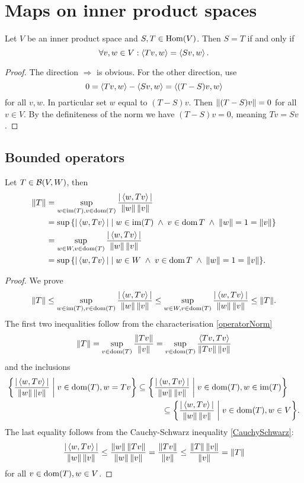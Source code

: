 \section{Maps on inner product spaces}

\begin{lemma} \label{equalityOfMapsInnerProductSpaces}
Let $V$ be an inner product space and $S,T\in\operatorname{Hom}(V)$. Then $S=T$ \textup{if and only if}
\[ \forall v,w\in V: \left\langle Tv,w \right\rangle = \left\langle Sv,w \right\rangle. \]
\end{lemma}
\begin{proof}
The direction $\boxed{\Rightarrow}$ is obvious. For the other direction, use
\[ 0 = \left\langle Tv,w \right\rangle - \left\langle Sv,w \right\rangle = \left\langle (T-S)v,w \right\rangle \]
for all $v,w$. In particular set $w$ equal to $(T-S)v$. Then $\lVert(T-S)v\rVert = 0$ for all $v\in V$. By the definiteness of the norm we have $(T-S)v = 0$, meaning $Tv = Sv$.
\end{proof}

\subsection{Bounded operators}
\begin{lemma} \label{operatorNormInnerProduct}
Let $T\in\operatorname{\mathcal{B}}(V,W)$, then
\begin{align*}
\norm{T} &= \sup_{w\in \im(T),v \in \dom(T)} \frac{|\inner{w,Tv}|}{\norm{w}\,\norm{v}} \\
&= \sup\setbuilder{|\inner{w,Tv}|}{w\in \im(T)\;\land\; v\in\dom{T}\;\land\; \norm{w} = 1 = \norm{v}} \\
&= \sup_{w\in W,v \in \dom(T)} \frac{|\inner{w,Tv}|}{\norm{w}\,\norm{v}} \\
&= \sup\setbuilder{|\inner{w,Tv}|}{w\in W\;\land\; v\in\dom{T}\;\land\; \norm{w} = 1 = \norm{v}}.
\end{align*}
\end{lemma}
\begin{proof}
We prove
\[ \lVert T\rVert \leq \sup_{w\in \operatorname{im}(T),v \in \operatorname{dom}(T)} \frac{|\left\langle w,Tv \right\rangle|}{\lVert w\rVert\,\lVert v\rVert} \leq \sup_{w\in W,v \in \operatorname{dom}(T)} \frac{|\left\langle w,Tv \right\rangle|}{\lVert w\rVert\,\lVert v\rVert} \leq \lVert T\rVert. \]
The first two inequalities follow from the characterisation \ref{operatorNorm}
\[ \lVert T\rVert = \sup_{v \in \operatorname{dom}(T)} \frac{\lVert Tv\rVert}{\lVert v\rVert} = \sup_{v \in \operatorname{dom}(T)} \frac{\left\langle Tv,Tv \right\rangle}{\lVert Tv\rVert\,\lVert v\rVert} \]
and the inclusions
\begin{align*}
\setbuilder{\frac{|\inner{w,Tv}|}{\norm{w}\,\norm{v}}}{v\in\dom(T), w = Tv} &\subseteq \setbuilder{\frac{|\inner{w,Tv}|}{\norm{w}\,\norm{v}}}{v\in\dom(T), w\in\im(T)}\\
&\qquad\quad\subseteq \setbuilder{\frac{|\inner{w,Tv}|}{\norm{w}\,\norm{v}}}{v\in\dom(T), w\in V}.
\end{align*}
The last equality follows from the Cauchy-Schwarz inequality \ref{CauchySchwarz}:
\[ \frac{|\left\langle w,Tv \right\rangle|}{\lVert w\rVert\,\lVert v\rVert} \leq \frac{\lVert w\rVert\,\lVert Tv\rVert}{\lVert w\rVert\,\lVert v\rVert} = \frac{\lVert Tv\rVert}{\lVert v\rVert} \leq \frac{\lVert T\rVert\,\lVert v\rVert}{\lVert v\rVert} = \lVert T\rVert \]
for all $v\in\operatorname{dom}(T), w\in V$. 
\end{proof}


